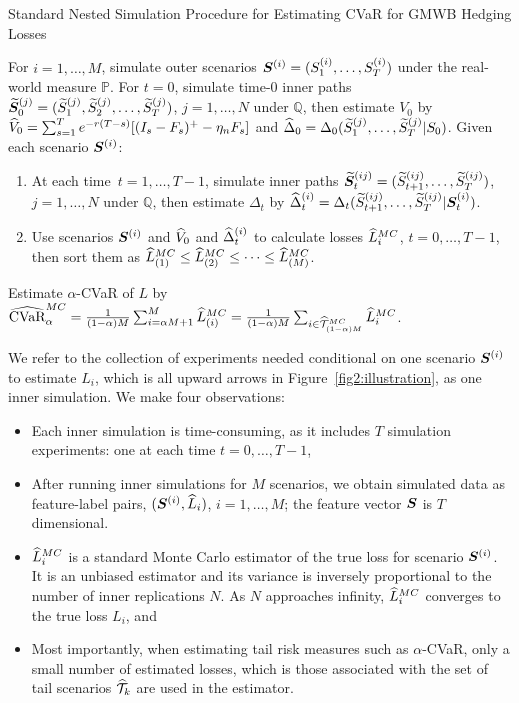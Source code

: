 \begin{algorithm} 
\caption{Standard Nested Simulation Procedure for Estimating CVaR for GMWB Hedging Losses}
\begin{algorithmic}[1] \label{alg2:standardProcedure}
    \STATE  For $i=1,\ldots,M$, simulate outer scenarios $\bm{S}^{(i)} = (S_{1}^{(i)},\ldots,S_{T}^{(i)})$ under the real-world measure $\mathbb{P}$.
    \STATE  For $t=0$, simulate time-$0$ inner paths $\widetilde{\bm{S}}_{0}^{(j)} = (\widetilde{S}_{1}^{(j)},\widetilde{S}_{2}^{(j)},\ldots,\widetilde{S}_{T}^{(j)})$, $j=1,\ldots,N$ under $\mathbb{Q}$, then estimate $V_0$ by $\widehat{V}_0 = \sum_{s=1}^{T} e^{-r(T-s)} [(I_s - F_s)^+- \eta_n F_s]$ and $\widehat{\Delta}_0 = \Delta_0(\widetilde{S}_{1}^{(j)},\ldots,\widetilde{S}_{T}^{(j)} | S_0)$.
    \STATE  Given each scenario $\bm{S}^{(i)}$:
    \begin{enumerate}[label=\alph*., itemsep=0pt, parsep=0pt, topsep=0pt]
        \item   At each time~$t=1,\ldots,T-1$, simulate inner paths $\widetilde{\bm{S}}_{t}^{(ij)} = (\widetilde{S}_{t+1}^{(ij)},\ldots,\widetilde{S}_{T}^{(ij)})$, $j=1,\ldots,N$ under $\mathbb{Q}$, then estimate $\Delta_t$ by $\widehat{\Delta}_t^{(i)} = \Delta_t(\widetilde{S}_{t+1}^{(ij)},\ldots,\widetilde{S}_{T}^{(ij)} | \bm{S}_t^{(i)})$.
        \item   Use scenarios $\bm{S}^{(i)}$ and $\widehat{V}_0$ and $\widehat{\Delta}_t^{(i)}$ to calculate losses $\widehat{L}_i^{MC}$, $t=0,\ldots,T-1$, then sort them as $\widehat{L}^{MC}_{(1)}\leq \widehat{L}^{MC}_{(2)} \leq \cdots\leq \widehat{L}^{MC}_{(M)}$.
    \end{enumerate}
    \STATE  Estimate $\alpha$-CVaR of $L$ by $\widehat{\mbox{CVaR}}^{MC}_\alpha = \frac{1}{(1-\alpha)M} \sum_{i=\alpha M + 1}^{M}\widehat{L}_{(i)}^{MC} = \frac{1}{(1-\alpha)M} \sum_{i \in \widehat{\mathcal{T}}_{(1-\alpha )M}^{MC}}\widehat{L}_{i}^{MC}$.
\end{algorithmic}
\end{algorithm}

We refer to the collection of experiments needed conditional on one scenario $\bm{S}^{(i)}$ to estimate $L_i$, which is all upward arrows in Figure~\ref{fig2:illustration}, as one inner simulation.
We make four observations:
\begin{itemize}
    \item   Each inner simulation is time-consuming, as it includes $T$ simulation experiments: one at each time $t=0,\ldots,T-1$,
    \item   After running inner simulations for $M$ scenarios, we obtain simulated data as feature-label pairs, $(\bm{S}^{(i)}, \widehat{L}_i)$, $i=1,\ldots,M$; the feature vector $\bm{S}$ is $T$ dimensional.
    \item   $\widehat{L}_i^{MC}$ is a standard Monte Carlo estimator of the true loss for scenario $\bm{S}^{(i)}$. 
    It is an unbiased estimator and its variance is inversely proportional to the number of inner replications $N$. 
    As $N$ approaches infinity, $\widehat{L}_i^{MC}$ converges to the true loss $L_i$, and
    \item   Most importantly, when estimating tail risk measures such as $\alpha$-CVaR, only a small number of estimated losses, which is those associated with the set of tail scenarios $\widehat{\mathcal{T}}_{k}$ are used in the estimator.
\end{itemize}

